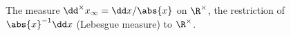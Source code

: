The measure $\dd^\times x_\infty=\dd x/\abs{x}$ on $\R^\times$, the restriction of $\abs{x}^{-1}\dd x$ (Lebesgue measure) to $\R^\times$.
